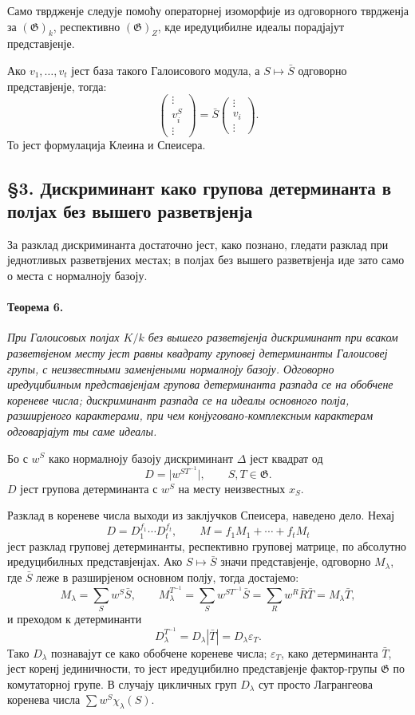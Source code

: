 \documentclass[11pt]{article}
\providecommand{\Gg}{\mathfrak{G}}
\begin{document}
Само тврдженје следује помоћу операторнеј изоморфије из одговорного тврдженја за \((\Gg)_k\), респективно \((\Gg)_Z\), кде иредуцибилне идеалы порадјајут представјенје.

Ако \(v_1,\ldots,v_t\) јест база такого Галоисового модула, а \(S\mapsto \bar S\) одговорно представјенје, тогда:
\[
        \begin{pmatrix}\vdots\\ v_i^S\\ \vdots\end{pmatrix}
        =\bar S\begin{pmatrix}\vdots\\ v_i\\ \vdots\end{pmatrix}.
\]
То јест формулација Клеина и Спеисера.

\subsection*{§3. Дискриминант како групова детерминанта в полјах без вышего разветвјенја}

За разклад дискриминанта достаточно јест, како познано, гледати разклад при једнотливых разветвјених местах; в полјах без вышего разветвјенја иде зато само о места с нормалноју базоју.

\paragraph{Теорема 6.}
\emph{При Галоисовых полјах \(K/k\) без вышего разветвјенја дискриминант при всаком разветвјеном месту јест равны квадрату груповеј детерминанты Галоисовеј групы, с неизвестными заменјеными нормалноју базоју. Одговорно иредуцибилным представјенјам групова детерминанта разпада се на обобчене кореневе числа; дискриминант разпада се на идеалы основного полја, разширјеного карактерами, при чем конјуговано-комплексным карактерам одговарјајут ты саме идеалы.}

Бо с \(w^S\) како нормалноју базоју дискриминант \(\Delta\) јест квадрат од
\[
        D=\bigl|w^{ST^{-1}}\bigr|,\qquad S,T\in\Gg.
\]
\(D\) јест групова детерминанта с \(w^S\) на месту неизвестных \(x_S\).

Разклад в кореневе числа выходи из заклјучков Спеисера, наведено дело. Нехај
\[
        D=D_1^{f_1}\cdots D_t^{f_t},
        \qquad
        M=f_1M_1+\cdots+f_tM_t
\]
јест разклад груповеј детерминанты, респективно груповеј матрице, по абсолутно иредуцибилных представјенјах. Ако \(S\mapsto\bar S\) значи представјенје, одговорно \(M_\lambda\), где \(\bar S\) леже в разширјеном основном полју, тогда достајемо:
\[
        M_\lambda=\sum_S w^S\bar S,
        \qquad
        M_\lambda^{T^{-1}}=\sum_S w^{ST^{-1}}\bar S
          =\sum_R w^R\bar R\bar T=M_\lambda\bar T,
\]
и преходом к детерминанти
\[
        D_\lambda^{T^{-1}}=D_\lambda|\bar T|=D_\lambda\varepsilon_T.
\]
Тако \(D_\lambda\) познавајут се како обобчене кореневе числа; \(\varepsilon_T\), како детерминанта \(\bar T\), јест коренј јединичности, то јест иредуцибилно представјенје фактор-групы \(\Gg\) по комутаторној групе. В случају цикличных груп \(D_\lambda\) сут просто Лагрангеова коренева числа \(\sum w^S\chi_\lambda(S)\).
\end{document}
